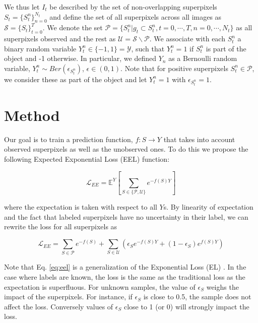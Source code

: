 We thus let $I_t$ be described by the set of non-overlapping superpixels
$S_{t} = \{S^{n}_t\}^{N_t}_{n=0}$ and define the set of all superpixels across all
images as $\mathcal{S} = \{S_t \}^{T}_{t=0}$.
We denote the set $\mathcal{P} = \{S^{n}_t | g_{t} \subset S^{n}_t, t = 0, \cdots, T, n = 0, \cdots, N_t \}$ as all
superpixels observed and the rest as $\mathcal{U} = \mathcal{S} \backslash \mathcal{P}$.
We associate with each $S^{n}_t$ a binary random variable $Y^{n}_{t} \in \{-1, 1\} = \mathcal{Y}$,
such that $Y^{n}_t = 1$ if $S^{n}_t$ is part of the object and -1 otherwise.
In particular, we defined $Y_n$ as a Bernoulli random variable, $Y^{n}_t \sim Ber(\epsilon_{S^{n}_{t}})$, $\epsilon \in (0,1)$.
Note that for positive superpixels $S^{n}_t \in \mathcal{P}$, we consider these as part of the object and let $Y^{n}_t = 1$ with $\epsilon_{S^{n}_{t}}=1$.

\section{Method}
Our goal is to train a prediction function, $f : S \rightarrow Y$
that takes into account observed superpixels as well as the unobserved ones.
To do this we propose the following Expected Exponential Loss (EEL) function:

\begin{equation}
  \mathcal{L}_{EE} = \mathbb{E}^{Y} \left[ \sum_{S \in \{ \mathcal{P}, \mathcal{U}\}} e^{-f(S)Y}\right]
\end{equation}

where the expectation is taken with respect to all $Y$s.
By linearity of expectation and the fact that labeled superpixels have no uncertainty in their label, we can rewrite the loss for all superpixels as

\begin{equation}
  \label{eq:eel}
  \mathcal{L}_{EE} = \sum_{S \in \mathcal{P}} e^{-f(S)} + \sum_{S \in \mathcal{U}} \left(  \epsilon_{S} e^{-f(S)Y} + (1-\epsilon_{S}) e^{f(S)Y}\right)
\end{equation}

Note that Eq. \ref{eq:eel} is a generalization of the Exponential Loss (EL) \cite{hastie09}.
In the case where labels are known, the loss is the same as the traditional loss as the expectation is superfluous.
For unknown samples, the value of $\epsilon_{S}$ weighs the impact of the superpixels.
For instance, if $\epsilon_{S}$ is close to 0.5, the sample does not affect the loss.
Conversely values of $\epsilon_{S}$ close to 1 (or 0) will strongly impact the loss.

